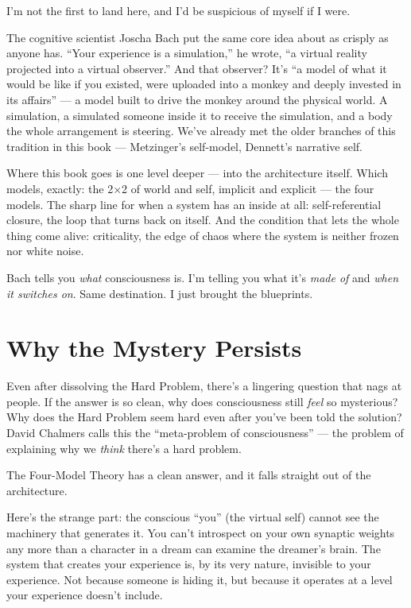 \documentclass[11pt, twoside, openright]{book}
\begin{document}
I'm not the first to land here, and I'd be suspicious of myself if I were.

The cognitive scientist Joscha Bach put the same core idea about as crisply as anyone has. ``Your experience is a simulation,'' he wrote, ``a virtual reality projected into a virtual observer.'' And that observer? It's ``a model of what it would be like if you existed, were uploaded into a monkey and deeply invested in its affairs'' --- a model built to drive the monkey around the physical world. A simulation, a simulated someone inside it to receive the simulation, and a body the whole arrangement is steering. We've already met the older branches of this tradition in this book --- Metzinger's self-model, Dennett's narrative self.

Where this book goes is one level deeper --- into the architecture itself. Which models, exactly: the 2×2 of world and self, implicit and explicit --- the four models. The sharp line for when a system has an inside at all: self-referential closure, the loop that turns back on itself. And the condition that lets the whole thing come alive: criticality, the edge of chaos where the system is neither frozen nor white noise.

Bach tells you \textit{what} consciousness is. I'm telling you what it's \textit{made of} and \textit{when it switches on}. Same destination. I just brought the blueprints.

\section*{Why the Mystery Persists}

Even after dissolving the Hard Problem, there's a lingering question that nags at people. If the answer is so clean, why does consciousness still \textit{feel} so mysterious? Why does the Hard Problem seem hard even after you've been told the solution? David Chalmers calls this the ``meta-problem of consciousness'' --- the problem of explaining why we \textit{think} there's a hard problem.

The Four-Model Theory has a clean answer, and it falls straight out of the architecture.

Here's the strange part: the conscious ``you'' (the virtual self) cannot see the machinery that generates it. You can't introspect on your own synaptic weights any more than a character in a dream can examine the dreamer's brain. The system that creates your experience is, by its very nature, invisible to your experience. Not because someone is hiding it, but because it operates at a level your experience doesn't include.
\end{document}
